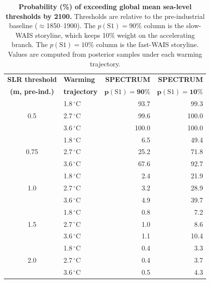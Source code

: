 \documentclass[12pt]{article}
\begin{document}
\begin{table}[!htbp]
\centering
\caption{\textbf{Probability (\%) of exceeding global mean sea-level thresholds by 2100.} Thresholds are relative to the pre-industrial baseline ($\approx$1850--1900). The $p(\mathrm{S1}) = 90\%$ column is the slow-WAIS storyline, which keeps 10\% weight on the accelerating branch. The $p(\mathrm{S1}) = 10\%$ column is the fast-WAIS storyline. Values are computed from posterior samples under each warming trajectory.}
\label{tab:exceedance}
\begin{tabular}{cl rr}
\hline
\textbf{SLR threshold} & \textbf{Warming} & \textbf{SPECTRUM} & \textbf{SPECTRUM} \\
\textbf{(m, pre-ind.)} & \textbf{trajectory} & \textbf{$\boldsymbol{p(\mathrm{S1})=90\%}$} & \textbf{$\boldsymbol{p(\mathrm{S1})=10\%}$} \\
\hline
\multirow{3}{*}{0.5}   & 1.8\,$^\circ$C &  93.7 &  99.3 \\
                        & 2.7\,$^\circ$C &  99.6 & 100.0 \\
                        & 3.6\,$^\circ$C & 100.0 & 100.0 \\
\hline
\multirow{3}{*}{0.75}  & 1.8\,$^\circ$C &   6.5 &  49.4 \\
                        & 2.7\,$^\circ$C &  25.2 &  71.8 \\
                        & 3.6\,$^\circ$C &  67.6 &  92.7 \\
\hline
\multirow{3}{*}{1.0}   & 1.8\,$^\circ$C &   2.4 &  21.9 \\
                        & 2.7\,$^\circ$C &   3.2 &  28.9 \\
                        & 3.6\,$^\circ$C &   4.9 &  39.7 \\
\hline
\multirow{3}{*}{1.5}   & 1.8\,$^\circ$C &   0.8 &   7.2 \\
                        & 2.7\,$^\circ$C &   1.0 &   8.6 \\
                        & 3.6\,$^\circ$C &   1.1 &  10.4 \\
\hline
\multirow{3}{*}{2.0}   & 1.8\,$^\circ$C &   0.4 &   3.3 \\
                        & 2.7\,$^\circ$C &   0.4 &   3.7 \\
                        & 3.6\,$^\circ$C &   0.5 &   4.3 \\
\hline
\end{tabular}
\end{table}

\FloatBarrier
\end{document}
